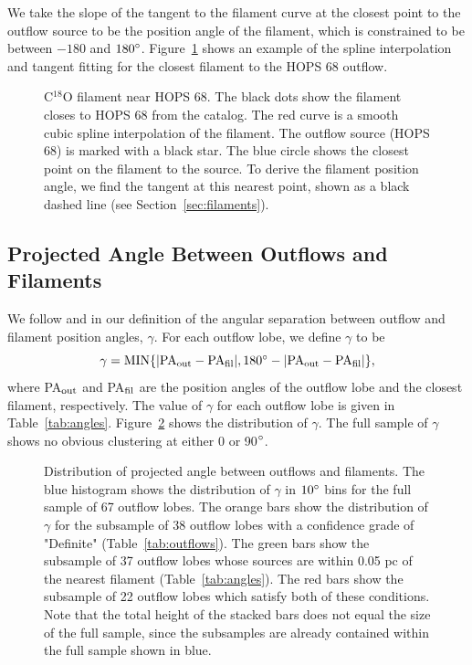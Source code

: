 \documentclass[twocolumn]{aastex63}
\newcommand{\nlobes}{67}
\newcommand{\example}{HOPS 68}
\begin{document}
We take the slope of the tangent to the filament curve at the closest point to the outflow source to be the position angle of the filament, which is constrained to be between $-180$ and $180\mbox{$^\circ$}$. Figure~\ref{fig:filament} shows an example of the spline interpolation and tangent fitting for the closest filament to the \example{} outflow.

\begin{figure}
\caption{C$^{18}$O filament near \example{}. The black dots show the filament closes to \example{} from the \citet{Suri19} catalog. The red curve is a smooth cubic spline interpolation of the filament. The outflow source (\example{}) is marked with a black star. The blue circle shows the closest point on the filament to the source. To derive the filament position angle, we find the tangent at this nearest point, shown as a black dashed line (see Section~\ref{sec:filaments}).\label{fig:filament}}
\end{figure}

\subsection{Projected Angle Between Outflows and Filaments}\label{sec:gamma}

We follow \citet{Stephens17} and \citet{Kong19} in our definition of the angular separation between outflow and filament position angles, $\gamma$. For each outflow lobe, we define $\gamma$ to be 
\begin{equation}
    \gamma = \rm{MIN}\{|\rm{PA}_{\rm out} - \rm{PA}_{\rm fil}|, 180\degr - |\rm{PA}_{\rm out} - \rm{PA}_{\rm fil}|\},
\end{equation}
where PA$_{\rm out}$ and PA$_{\rm fil}$ are the position angles of the outflow lobe and the closest filament, respectively. The value of $\gamma$ for each outflow lobe is given in Table~\ref{tab:angles}. Figure~\ref{fig:gamma_hist} shows the distribution of $\gamma$. The full sample of $\gamma$ shows no obvious clustering at either 0 or 90$\mbox{$^\circ$}$.

\begin{figure}
\caption{Distribution of projected angle between outflows and filaments. The blue histogram shows the distribution of $\gamma$ in $10\mbox{$^\circ$}$ bins for the full sample of \nlobes{} outflow lobes. The orange bars show the distribution of $\gamma$ for the subsample of 38 outflow lobes with a confidence grade of "Definite" (Table~\ref{tab:outflows}). The green bars show the subsample of 37 outflow lobes whose sources are within 0.05 pc of the nearest filament (Table~\ref{tab:angles}). The red bars show the subsample of 22 outflow lobes which satisfy both of these conditions. Note that the total height of the stacked bars does not equal the size of the full sample, since the subsamples are already contained within the full sample shown in blue. \label{fig:gamma_hist}}
\end{figure}
\end{document}
